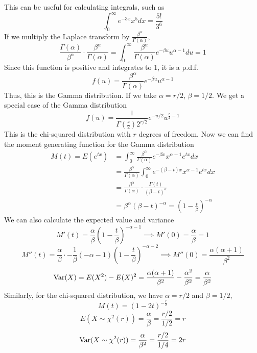 This can be useful for calculating integrals, such as 
\[\int_0^\infty e^{-3x}x^5dx = \frac{5!}{3^6}\]
If we multiply the Laplace transform by $\frac{\beta^\alpha}{\Gamma(\alpha)}$, 
\[\frac{\Gamma(\alpha)}{\beta^\alpha} \cdot \frac{\beta^\alpha}{\Gamma(\alpha)} = \int_0^\infty \frac{\beta^{\alpha}}{\Gamma(\alpha)}e^{-\beta u}u^{\alpha -1}du = 1 \]
Since this function is positive and integrates to 1, it is a p.d.f. 
\[f(u) = \frac{\beta^{\alpha}}{\Gamma(\alpha)}e^{-\beta u}u^{\alpha -1}\]
Thus, this is the Gamma distribution. If we take $\alpha = r/2$, $\beta = 1/2$. We get a special case of the Gamma distribution 
\[f(u) = \frac{1}{\Gamma\left(\frac{r}{2}\right)2^{r/2}}e^{-u/2}u^{\frac{r}{2}-1}\]
This is the chi-squared distribution with $r$ degrees of freedom. Now we can find the moment generating function for the Gamma distribution 
\begin{align*}
    M(t) = E(e^{tx}) &= \int_0^\infty \frac{\beta^\alpha}{\Gamma(\alpha)}e^{-\beta x}x^{\alpha -1}e^{tx}dx\\
    &= \frac{\beta^\alpha}{\Gamma(\alpha)}\int_0^\infty e^{-(\beta-t) x}x^{\alpha -1}e^{tx}dx\\
    &= \frac{\beta^\alpha}{\Gamma(\alpha)}\cdot \frac{\Gamma(t)}{(\beta-t)^\alpha}\\
    &= \beta^\alpha(\beta-t)^{-\alpha} = \left(1 - \frac{t}{\beta}\right)^{-\alpha} 
\end{align*}
We can also calculate the expected value and variance
\[M'(t) = \frac{\alpha}{\beta}\left(1 - \frac{t}{\beta}\right)^{-\alpha - 1} \implies M'(0) = \frac{\alpha}{\beta} = 1\]
\[M''(t) = \frac{\alpha}{\beta} \cdot -\frac{1}{\beta}(-\alpha -1)\left(1 - \frac{t}{\beta}\right)^{-\alpha -2} \implies M''(0) = \frac{\alpha(\alpha+1)}{\beta^2}\]
\[\operatorname{Var}(X) = E(X^2)-E(X)^2 = \frac{\alpha(\alpha+1)}{\beta^2} - \frac{\alpha^2}{\beta^2} = \frac{\alpha}{\beta^2}\]
Similarly, for the chi-squared distribution, we have $\alpha = r/2$ and $\beta = 1/2$,
\[M(t) = (1-2t)^{-\frac{r}{2}}\]
\[E(X\sim \chi^2(r)) = \frac{\alpha}{\beta}=\frac{r/2}{1/2} = r\]
\[\operatorname{Var}(X \sim \chi^2(r)) = \frac{\alpha}{\beta^2} = \frac{r/2}{1/4} = 2r \]

